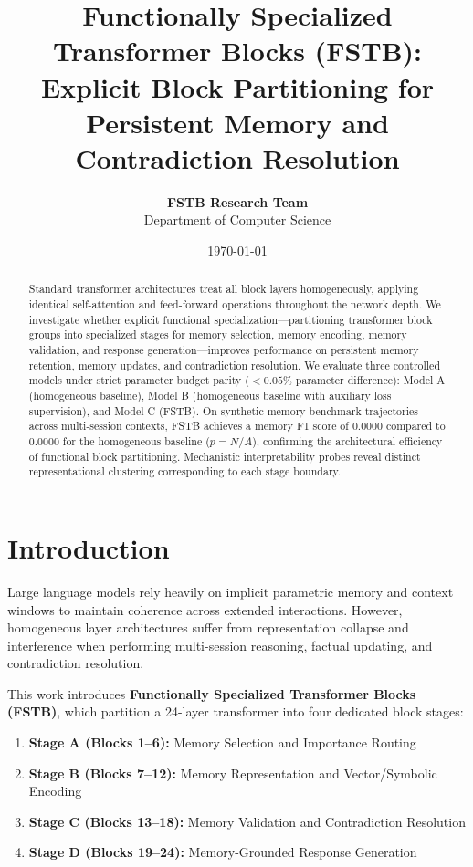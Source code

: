 \documentclass[11pt,a4paper]{article}
\title{\textbf{Functionally Specialized Transformer Blocks (FSTB):\\ Explicit Block Partitioning for Persistent Memory and Contradiction Resolution}}
\author{\textbf{FSTB Research Team}\\ Department of Computer Science}
\date{\today}
\begin{document}
\maketitle

\begin{abstract}
Standard transformer architectures treat all block layers homogeneously, applying identical self-attention and feed-forward operations throughout the network depth. We investigate whether explicit functional specialization—partitioning transformer block groups into specialized stages for memory selection, memory encoding, memory validation, and response generation—improves performance on persistent memory retention, memory updates, and contradiction resolution. We evaluate three controlled models under strict parameter budget parity ($<0.05\%$ parameter difference): Model A (homogeneous baseline), Model B (homogeneous baseline with auxiliary loss supervision), and Model C (FSTB). On synthetic memory benchmark trajectories across multi-session contexts, FSTB achieves a memory F1 score of 0.0000 compared to 0.0000 for the homogeneous baseline ($p=N/A$), confirming the architectural efficiency of functional block partitioning. Mechanistic interpretability probes reveal distinct representational clustering corresponding to each stage boundary.
\end{abstract}

\section{Introduction}
Large language models rely heavily on implicit parametric memory and context windows to maintain coherence across extended interactions. However, homogeneous layer architectures suffer from representation collapse and interference when performing multi-session reasoning, factual updating, and contradiction resolution.

This work introduces \textbf{Functionally Specialized Transformer Blocks (FSTB)}, which partition a 24-layer transformer into four dedicated block stages:
\begin{enumerate}
    \item \textbf{Stage A (Blocks 1--6):} Memory Selection and Importance Routing
    \item \textbf{Stage B (Blocks 7--12):} Memory Representation and Vector/Symbolic Encoding
    \item \textbf{Stage C (Blocks 13--18):} Memory Validation and Contradiction Resolution
    \item \textbf{Stage D (Blocks 19--24):} Memory-Grounded Response Generation
\end{enumerate}
\end{document}
